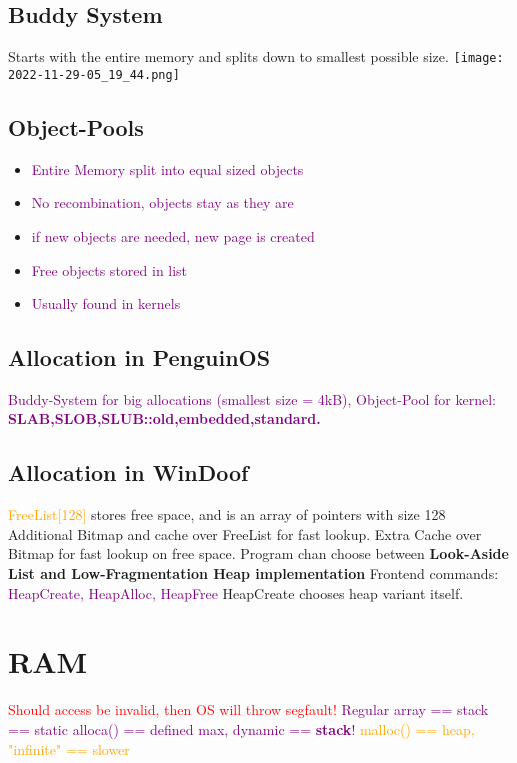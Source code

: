 \documentclass[main.tex,fontsize=8pt,paper=a4,paper=landscape,DIV=calc,]{scrartcl}
\begin{document}
\begin{multicols*}{4}
\subsection{Buddy System}
Starts with the entire memory and splits down to smallest possible size.\newline
\texttt{[image: 2022-11-29-05\_19\_44.png]}

\subsection{Object-Pools}
\begin{itemize}
\item \textcolor{purple}{Entire Memory split into equal sized objects}
\item \textcolor{purple}{No recombination, objects stay as they are}
\item \textcolor{purple}{if new objects are needed, new page is created}
\item \textcolor{purple}{Free objects stored in list}
\item \textcolor{purple}{Usually found in kernels}
\end{itemize} 

\subsection{Allocation in PenguinOS}
\textcolor{purple}{Buddy-System for big allocations (smallest size = 4kB), Object-Pool for kernel: \newline 
\textbf{SLAB,SLOB,SLUB::old,embedded,standard.}}

\subsection{Allocation in WinDoof}
\textcolor{orange}{FreeList[128]} stores free space, and is an array of pointers with size 128\newline
Additional Bitmap and cache over FreeList for fast lookup.\newline
Extra Cache over Bitmap for fast lookup on free space.\newline
Program chan choose between \textbf{Look-Aside List and Low-Fragmentation Heap implementation}\newline
Frontend commands: \textcolor{purple}{HeapCreate, HeapAlloc, HeapFree}\newline
HeapCreate chooses heap variant itself.

\section{RAM}
\textcolor{red}{Should access be invalid, then OS will throw segfault!}\newline
\textcolor{purple}{Regular array == stack == static}\newline
\textcolor{purple}{alloca() == defined max, dynamic == \textbf{stack}!}\newline
\textcolor{orange}{malloc() == heap, "infinite" == slower} 


\end{multicols*}
\end{document}
